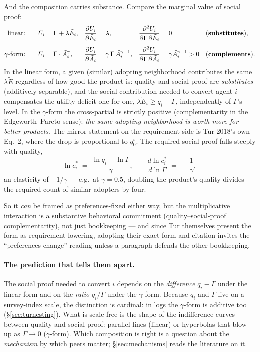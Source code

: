 \documentclass[11pt,a4paper]{article}
\newcommand{\Ee}{\tilde{E}}                 %
\newcommand{\Acount}{\tilde{A}}             %
\begin{document}
And the composition carries substance. Compare the marginal value of social proof:
\begin{align}
  \text{linear:}\qquad
  & U_i = \Gamma + \lambda \Ee_i,
  & \frac{\partial U_i}{\partial \Ee_i} &= \lambda,
  & \frac{\partial^2 U_i}{\partial \Gamma\, \partial \Ee_i} &= 0
  && \text{(\textbf{substitutes})},\\[4pt]
  \text{$\gamma$-form:}\qquad
  & U_i = \Gamma \cdot \Acount_i^{\gamma},
  & \frac{\partial U_i}{\partial \Acount_i} &= \gamma\, \Gamma\, \Acount_i^{\gamma - 1},
  & \frac{\partial^2 U_i}{\partial \Gamma\, \partial \Acount_i} &= \gamma \Acount_i^{\gamma-1} > 0
  && \text{(\textbf{complements})}.
\end{align}
In the linear form, a given (similar) adopting neighborhood contributes the same
$\lambda \Ee$ regardless of how good the product is: quality and social proof are
\emph{substitutes} (additively separable), and the social contribution needed to convert
agent $i$ compensates the utility deficit one-for-one, $\lambda \Ee_i \ge q_i - \Gamma$,
independently of $\Gamma$'s level. In the $\gamma$-form the cross-partial is strictly
positive (complementarity in the Edgeworth--Pareto sense): \emph{the same adopting
neighborhood is worth more for better products}. The mirror statement on the requirement
side is Tur 2018's own Eq.~2, where the drop is proportional to $q_0^i$. The required
social proof falls steeply with quality,
\begin{equation}
  \ln c_i^{*} \;=\; \frac{\ln q_i - \ln \Gamma}{\gamma},
  \qquad
  \frac{d \ln c_i^{*}}{d \ln \Gamma} \;=\; -\frac{1}{\gamma},
\end{equation}
an elasticity of $-1/\gamma$ --- e.g.\ at $\gamma = 0.5$, doubling the product's quality
divides the required count of similar adopters by four.

So it \emph{can} be framed as preferences-fixed either way, but the multiplicative
interaction is a substantive behavioral commitment (quality--social-proof
complementarity), not just bookkeeping --- and since Tur themselves present the form as
requirement-lowering, adopting their exact form and citation invites the ``preferences
change'' reading unless a paragraph defends the other bookkeeping.

\paragraph{The prediction that tells them apart.} The social proof needed to convert $i$
depends on the \emph{difference} $q_i - \Gamma$ under the linear form and on the
\emph{ratio} $q_i / \Gamma$ under the $\gamma$-form. Because $q_i$ and $\Gamma$ live on
a survey-index scale, the distinction is cardinal: in logs the $\gamma$-form is additive
too (\S\ref{sec:turnesting}). What is scale-free is the shape of the indifference curves
between quality and social proof: parallel lines (linear) or hyperbolas that blow up as
$\Gamma \to 0$ ($\gamma$-form). Which composition is right is a question about the
\emph{mechanism} by which peers matter; \S\ref{sec:mechanisms} reads the literature on
it.
\end{document}
